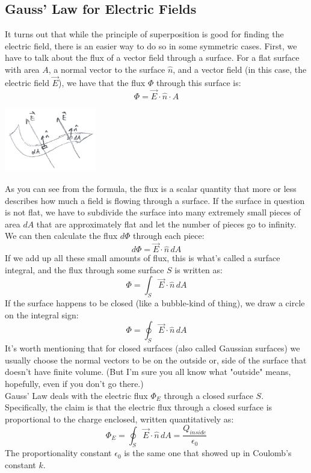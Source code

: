\subsection{Gauss' Law for Electric Fields}
It turns out that while the principle of superposition is good for finding the electric field, there is an easier way to do so in some symmetric cases. First, we have to talk about the flux of a vector field through a surface. For a flat surface with area $A$, a normal vector to the surface $\hat n$, and a vector field (in this case, the electric field $\vec E$), we have that the flux $\Phi$ through this surface is:
\[
	\Phi = \vec E \cdot \hat n \cdot A
\]
\begin{center}
	\includegraphics[width=0.3\textwidth]{images/em/electricflux.png}
\end{center}
As you can see from the formula, the flux is a scalar quantity that more or less describes how much a field is flowing through a surface. If the surface in question is not flat, we have to subdivide the surface into many extremely small pieces of area $dA$ that are approximately flat and let the number of pieces go to infinity. We can then calculate the flux $d\Phi$ through each piece:
\[
	d\Phi = \vec E \cdot \hat n \, dA
\]
If we add up all these small amounts of flux, this is what's called a  surface integral, and the flux through some surface $S$ is written as:
\[
	\Phi = \int_S \vec E \cdot \hat n \, dA
\]
If the surface happens to be closed (like a bubble-kind of thing), we draw a circle on the integral sign:
\[
	\Phi = \oint_S \vec E \cdot \hat n\, dA
\]
It's worth mentioning that for closed surfaces (also called Gaussian surfaces) we usually choose the normal vectors to be on the outside or, side of the surface that doesn't have finite volume. (But I'm sure you all know what "outside" means, hopefully, even if you don't go there.)\\
Gauss' Law deals with the electric flux $\Phi_E$ through a closed surface $S$. Specifically, the claim is that the electric flux through a closed surface is proportional to the charge enclosed, written quantitatively as:
\[
	\Phi_E = \oint_S \vec E \cdot \hat n \, dA = \frac{Q_{inside}}{\epsilon_0}
\]
The proportionality constant $\epsilon_0$ is the same one that showed up in Coulomb's constant $k$. \\
